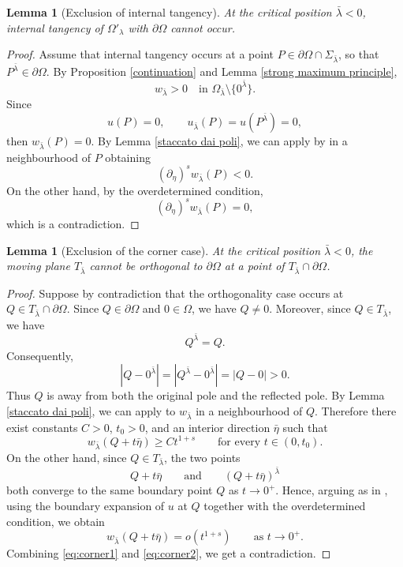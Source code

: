 \documentclass[11pt,a4paper]{article}
\newtheorem{lemma}[theorem]{Lemma}
\begin{document}
\begin{lemma}[Exclusion of internal tangency]\label{no tangency}
At the critical position \(\bar\lambda<0\), internal tangency of $\Omega'_{\lambda}$ with \(\partial\Omega\) cannot occur.
\end{lemma}

\begin{proof}
Assume that internal tangency occurs at a point \(P\in\partial\Omega\cap\Sigma_{\bar\lambda}\), so that \(P^{\bar\lambda}\in\partial\Omega\). By Proposition \ref{continuation} and Lemma \ref{strong maximum principle},
\[
w_{\bar\lambda}>0
\quad\text{in }\Omega_{\bar\lambda}\setminus\{0^{\bar\lambda}\}.
\]
Since
\[
u(P)=0,\qquad u_{\bar\lambda}(P)=u(P^{\bar\lambda})=0,
\]
then \(w_{\bar\lambda}(P)=0\). By Lemma \ref{staccato dai poli}, we can apply by \cite[Proposition 3.3]{FallJarohs} in a neighbourhood of $P$ obtaining
\[
(\partial_\eta)^s w_{\bar\lambda}(P)<0.
\]
On the other hand, by the overdetermined condition,
\[
(\partial_\eta)^s w_{\bar\lambda}(P)
=0,
\]
which is a contradiction.
\end{proof}

\begin{lemma}[Exclusion of the corner case]\label{no corner}
At the critical position \(\bar\lambda<0\), the moving plane \(T_{\bar\lambda}\) cannot be orthogonal to \(\partial\Omega\) at a point of \(T_{\bar\lambda}\cap\partial\Omega\).
\end{lemma}

\begin{proof}
Suppose by contradiction that the orthogonality case occurs at
\(Q\in T_{\bar\lambda}\cap\partial\Omega\). Since \(Q\in\partial\Omega\) and
\(0\in\Omega\), we have \(Q\neq0\). Moreover, since
\(Q\in T_{\bar\lambda}\), we have
\[
Q^{\bar\lambda}=Q.
\]
Consequently,
\[
|Q-0^{\bar\lambda}|=|Q^{\bar\lambda}-0^{\bar\lambda}|=|Q-0|>0.
\]
Thus \(Q\) is away from both the original pole and the reflected pole. By
Lemma \ref{staccato dai poli}, we can apply
\cite[Lemma 4.4]{FallJarohs} to \(w_{\bar\lambda}\) in a neighbourhood of
\(Q\). Therefore there exist constants \(C>0\), \(t_0>0\), and an interior
direction \(\bar\eta\) such that
\begin{equation}\label{eq:corner1}
w_{\bar\lambda}(Q+t\bar\eta)\ge C t^{1+s}
\qquad\text{for every }t\in(0,t_0).
\end{equation}
On the other hand, since \(Q\in T_{\bar\lambda}\), the two points
\[
Q+t\bar\eta
\qquad\text{and}\qquad
(Q+t\bar\eta)^{\bar\lambda}
\]
both converge to the same boundary point \(Q\) as \(t\to0^+\). Hence, arguing
as in \cite[Lemma 4.3]{FallJarohs}, using the boundary expansion of \(u\) at
\(Q\) together with the overdetermined condition, we obtain
\begin{equation}\label{eq:corner2}
w_{\bar\lambda}(Q+t\bar\eta)=o(t^{1+s})
\qquad\text{as }t\to0^+.
\end{equation}
Combining \eqref{eq:corner1} and \eqref{eq:corner2}, we get a contradiction.
\end{proof}
\end{document}

